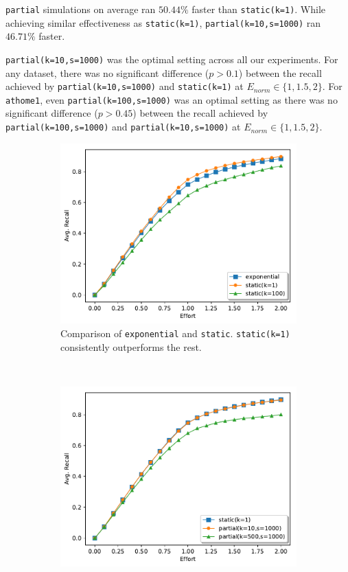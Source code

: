 \texttt{partial} simulations on average ran $50.44\%$ faster than
\texttt{static(k=1)}. While achieving similar effectiveness as 
\texttt{static(k=1)}, \texttt{partial(k=10,s=1000)} ran $46.71\%$ faster.

\texttt{partial(k=10,s=1000)} was the optimal setting across all our
experiments.  For any dataset, there was no significant difference ($p > 0.1$)
between the recall achieved by \texttt{partial(k=10,s=1000)} and
\texttt{static(k=1)} at $E_{norm} \in \{1,1.5,2\}$. For \texttt{athome1}, even
\texttt{partial(k=100,s=1000)} was an optimal setting as there was no
significant difference ($p > 0.45$) between the recall achieved by
\texttt{partial(k=100,s=1000)} and \texttt{partial(k=10,s=1000)} at $E_{norm}
\in \{1,1.5,2\}$.

\begin{figure}
    \centering
    \begin{subfigure}[t]{0.48\textwidth}
        \centering
        \includegraphics[width=\textwidth]{plots/bmi_static.pdf}
        \caption{Comparison of \texttt{exponential} and \texttt{static}.
            \texttt{static(k=1)} consistently outperforms the rest.}
        \label{plot:bmi_static}
    \end{subfigure}
    ~
    \begin{subfigure}[t]{0.48\textwidth}
        \centering
        \includegraphics[width=\textwidth]{plots/static_partial.pdf}

\end{subfigure}
\end{figure}

